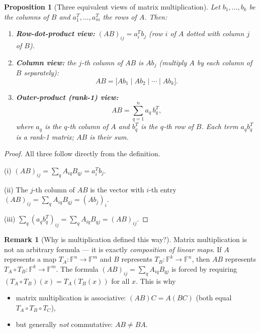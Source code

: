 \documentclass[11pt]{article}
\theoremstyle{definition}
\newtheorem{remark}{Remark}[section]
\theoremstyle{plain}
\newtheorem{proposition}{Proposition}[section]
\begin{document}
\begin{proposition}[Three equivalent views of matrix multiplication]
  Let $b_1,\ldots,b_k$ be the columns of $B$ and $a_1^T,\ldots,a_m^T$
  the rows of $A$.  Then:
  \begin{enumerate}[label=(\roman*)]
    \item \textbf{Row-dot-product view:}
      $(AB)_{ij} = a_i^T b_j$ (row $i$ of $A$ dotted with column $j$ of $B$).
    \item \textbf{Column view:}
      the $j$-th column of $AB$ is $A b_j$
      (multiply $A$ by each column of $B$ separately):
      \[
        AB = \bigl[Ab_1 \mid Ab_2 \mid \cdots \mid Ab_k\bigr].
      \]
    \item \textbf{Outer-product (rank-1) view:}
      \[
        AB = \sum_{q=1}^n a_q\, b_q^T,
      \]
      where $a_q$ is the $q$-th column of $A$ and $b_q^T$ is the $q$-th
      row of $B$.  Each term $a_q b_q^T$ is a rank-1 matrix; $AB$ is
      their sum.
  \end{enumerate}
\end{proposition}
\begin{proof}
  All three follow directly from the definition.

  (i) $(AB)_{ij} = \sum_q A_{iq}B_{qj} = a_i^T b_j$.

  (ii) The $j$-th column of $AB$ is the vector with $i$-th entry
  $(AB)_{ij} = \sum_q A_{iq}B_{qj} = (Ab_j)_i$.

  (iii) $\sum_q (a_q b_q^T)_{ij} = \sum_q A_{iq}B_{qj} = (AB)_{ij}$.
\end{proof}

\begin{remark}[Why is multiplication defined this way?]
  Matrix multiplication is not an arbitrary formula --- it is exactly
  \emph{composition of linear maps}.  If $A$ represents a map
  $T_A:\mathbb{F}^n\to\mathbb{F}^m$ and $B$ represents
  $T_B:\mathbb{F}^k\to\mathbb{F}^n$, then $AB$ represents
  $T_A\circ T_B:\mathbb{F}^k\to\mathbb{F}^m$.
  The formula $(AB)_{ij} = \sum_q A_{iq}B_{qj}$ is forced by requiring
  $(T_A\circ T_B)(x) = T_A(T_B(x))$ for all $x$.  This is why
  \begin{itemize}
    \item matrix multiplication is associative: $(AB)C = A(BC)$
          (both equal $T_A\circ T_B\circ T_C$),
    \item but generally \emph{not} commutative: $AB\ne BA$.
  \end{itemize}
\end{remark}
\end{document}
